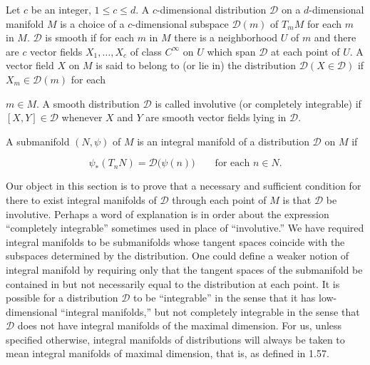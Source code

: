 \begin{definition}\label{thm:1.56}
	Let $c$ be an integer, $1 \leq c \leq d$. A $c$-dimensional distribution $\mathcal{D}$ on a $d$-dimensional manifold $M$ is a choice of a $c$-dimensional subspace $\mathcal{D}(m)$ of $T_{m} M$ for each $m$ in $M$. $\mathcal{D}$ is smooth if for each $m$ in $M$ there is a neighborhood $U$ of $m$ and there are $c$ vector fields $X_1, \ldots, X_c$ of class $C^\infty$ on $U$ which span $\mathcal{D}$ at each point of $U$. A vector field $X$ on $M$ is said to belong to (or lie in) the distribution $\mathcal{D}(X \in \mathcal{D})$ if $X_m \in \mathcal{D}(m)$ for each 

	$ m \in M $. A smooth distribution  $ \mathcal{D} $ is called involutive (or completely integrable) if  $ [X, Y] \in \mathcal{D} $ whenever  $ X $ and  $ Y $ are smooth vector fields lying in  $ \mathcal{D} $.

\end{definition}

\begin{definition}\label{thm:1.57}
	A submanifold $(N,\psi)$ of $M$ is an integral manifold of a distribution $\mathcal{D}$ on $M$ if 

	\begin{equation}
		\tag{1}\label{eq:1.57:1}
		\psi_{*}(T_{n} N)=\mathcal{D}\big(\psi(n)\big)\qquad\text{for each }n\in N.
	\end{equation}

\end{definition}

\begin{remarks}\label{thm:1.58}
	Our object in this section is to prove that a necessary and sufficient condition for there to exist integral manifolds of $\mathcal{D}$ through each point of $M$ is that $\mathcal{D}$ be involutive. Perhaps a word of explanation is in order about the expression “completely integrable” sometimes used in place of “involutive.” We have required integral manifolds to be submanifolds whose tangent spaces coincide with the subspaces determined by the distribution. One could define a weaker notion of integral manifold by requiring only that the tangent spaces of the submanifold be contained in but not necessarily equal to the distribution at each point. It is possible for a distribution $\mathcal{D}$ to be “integrable” in the sense that it has low-dimensional “integral manifolds,” but not completely integrable in the sense that $\mathcal{D}$ does not have integral manifolds of the maximal dimension. For us, unless specified otherwise, integral manifolds of distributions will always be taken to mean integral manifolds of maximal dimension, that is, as defined in 1.57.

\end{remarks}


